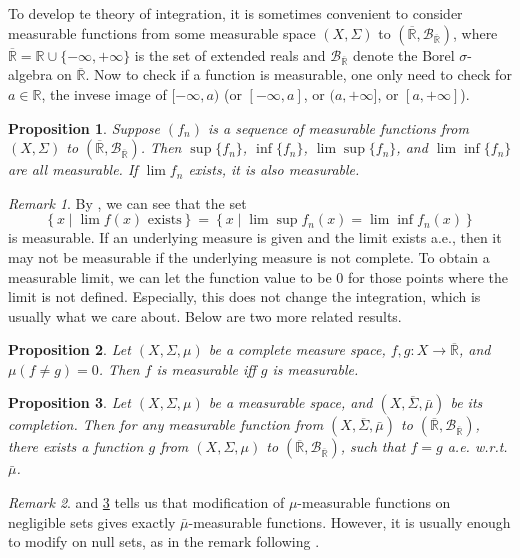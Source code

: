 \documentclass[openany]{book}
\newtheorem{proposition}{Proposition}[chapter]
\theoremstyle{definition}
\theoremstyle{remark}
\newtheorem*{remark}{Remark}
\begin{document}
To develop te theory of integration, it is sometimes convenient to consider measurable functions from some measurable space $(X,\Sigma)$ to $(\overline{\mathbb{R}},\mathcal{B}_{\overline{\mathbb{R}}})$, where $\overline{\mathbb{R}}=\mathbb{R}\cup\{-\infty,+\infty\}$ is the set of extended reals and $\mathcal{B}_{\overline{\mathbb{R}}}$ denote the Borel $\sigma$-algebra on $\overline{\mathbb{R}}$. Now to check if a function is measurable, one only need to check for $a\in \mathbb{R}$, the invese image of $[-\infty,a)$ (or $[-\infty,a]$, or $(a,+\infty]$, or $[a,+\infty]$).
\begin{proposition}\label{prop:limMeasurable}
    Suppose $(f_n)$ is a sequence of measurable functions from $(X,\Sigma)$ to $(\overline{\mathbb{R}},\mathcal{B}_{\overline{\mathbb{R}}})$. Then $\sup\{f_n\}$, $\inf\{f_n\}$, $\lim\sup\{f_n\}$, and $\lim\inf\{f_n\}$ are all measurable. If $\lim f_n$ exists, it is also measurable.
\end{proposition}
\begin{remark}
    By , we can see that the set
    \begin{equation*}
        \left\{x\middle|\lim f(x)\textrm{ exists}\right\}=\left\{x\middle|\lim\sup f_n(x)=\lim\inf f_n(x)\right\}
    \end{equation*}
    is measurable. If an underlying measure is given and the limit exists a.e., then it may not be measurable if the underlying measure is not complete. To obtain a measurable limit, we can let the function value to be $0$ for those points where the limit is not defined. Especially, this does not change the integration, which is usually what we care about. Below are two more related results.
\end{remark}
\begin{proposition}\label{prop:nullDiff}
    Let $(X,\Sigma,\mu)$ be a complete measure space, $f,g:X\to\overline{\mathbb{R}}$, and $\mu(f\ne g)=0$. Then $f$ is measurable iff $g$ is measurable.
\end{proposition}
\begin{proposition}\label{prop:negligibleDiff}
    Let $(X,\Sigma,\mu)$ be a measurable space, and $(X,\overline{\Sigma},\bar{\mu})$ be its completion. Then for any measurable function from $(X,\overline{\Sigma},\bar{\mu})$ to $(\overline{\mathbb{R}},\mathcal{B}_{\overline{\mathbb{R}}})$, there exists a function $g$ from $(X,\Sigma,\mu)$ to $(\overline{\mathbb{R}},\mathcal{B}_{\overline{\mathbb{R}}})$, such that $f=g$ a.e. w.r.t. $\bar{\mu}$.
\end{proposition}
\begin{remark}
     and \ref{prop:negligibleDiff} tells us that modification of $\mu$-measurable functions on negligible sets gives exactly $\bar{\mu}$-measurable functions. However, it is usually enough to modify on null sets, as in the remark following .
\end{remark}
\end{document}
